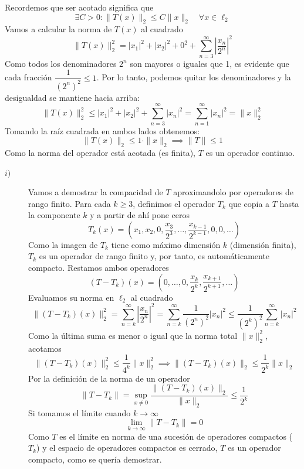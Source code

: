 \begin{ejercicio}
    \noindent
    Recordemos que ser acotado significa que
    \begin{equation*}
        \exists C > 0 : \|T(x)\|_2 \leq C \|x\|_2 \quad \forall x \in \ell_2
    \end{equation*}
    Vamos a calcular la norma de $T(x)$ al cuadrado
    $$\|T(x)\|_2^2 = |x_1|^2 + |x_2|^2 + 0^2 + \sum_{n=3}^{\infty} \left| \frac{x_n}{2^{n}} \right|^2$$
    Como todos los denominadores $2^{n}$ son mayores o iguales que 1, es evidente que cada fracción $\dfrac{1}{(2^{n})^2} \le 1$. Por lo tanto, podemos quitar los denominadores y la desigualdad se mantiene hacia arriba:$$\|T(x)\|_2^2 \le |x_1|^2 + |x_2|^2 + \sum_{n=3}^{\infty} |x_n|^2 = \sum_{n=1}^{\infty} |x_n|^2 = \|x\|_2^2$$Tomando la raíz cuadrada en ambos lados obtenemos:$$\|T(x)\|_2 \le 1 \cdot \|x\|_2 \implies \|T\| \le 1$$Como la norma del operador está acotada (es finita), $T$ es un operador continuo.
    \begin{description}
        \item[$i)$] Vamos a demostrar la compacidad de $T$ aproximandolo por operadores de rango finito. Para cada $k \geq 3$, definimos el operador $T_k$ que copia a $T$ hasta la componente $k$ y a partir de ahí pone ceros
        $$T_k(x) = \left( x_1, x_2, 0, \frac{x_3}{2^3}, \dots, \frac{x_{k-1}}{2^{k-1}}, 0, 0, \dots \right)$$
        Como la imagen de $T_k$ tiene como máximo dimensión $k$ (dimensión finita), $T_k$ es un operador de rango finito y, por tanto, es automáticamente compacto. Restamos ambos operadores
        $$(T - T_k)(x) = \left( 0, \dots, 0, \frac{x_k}{2^{k}}, \frac{x_{k+1}}{2^{k+1}}, \dots \right)$$
        Evaluamos su norma en $\ell_2$ al cuadrado
        $$\|(T - T_k)(x)\|_2^2 = \sum_{n=k}^{\infty} \left| \frac{x_n}{2^{n}} \right|^2 = \sum_{n=k}^{\infty} \frac{1}{(2^{n})^2} |x_n|^2 \leq \frac{1}{(2^{k})^2} \sum_{n=k}^{\infty} |x_n|^2$$
        Como la última suma es menor o igual que la norma total $\|x\|_2^2$, acotamos
        $$\|(T - T_k)(x)\|_2^2 \leq \frac{1}{4^{k}} \|x\|_2^2 \implies \|(T - T_k)(x)\|_2 \leq \frac{1}{2^{k}} \|x\|_2$$
        Por la definición de la norma de un operador
        $$\|T - T_k\| = \sup_{x \neq 0} \frac{\|(T - T_k)(x)\|_2}{\|x\|_2} \leq \frac{1}{2^{k}}$$
        Si tomamos el límite cuando $k \to \infty$
        $$\lim_{k \to \infty} \|T - T_k\| = 0$$
        Como $T$ es el límite en norma de una sucesión de operadores compactos ($T_k$) y el espacio de operadores compactos es cerrado, $T$ es un operador compacto, como se quería demostrar.


\end{description}
\end{ejercicio}
